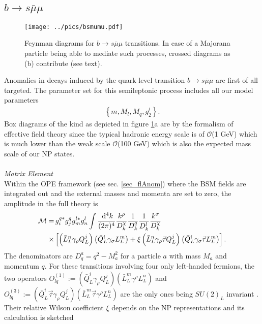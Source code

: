 \subsection{$b\rightarrow s\bar\mu\mu$}
\label{sec_bsmumu}
\begin{figure}[t]
 \texttt{[image: ../pics/bsmumu.pdf]}
 \caption{Feynman diagrams for $b\rightarrow s \bar\mu\mu$ transitions. In case of a Majorana particle being able to mediate such processes, crossed
 diagrams as (b) contribute (see text).}
 \label{pic_Bsmumu}
\end{figure}
Anomalies in decays induced by the quark level transition $b\rightarrow s\bar\mu\mu$ are first of all targeted. The parameter set for this 
semileptonic process includes all our model parameters
\begin{align}
 \left\{m, M_l, M_q, g_2^l\right\}.
\end{align}
Box diagrams of the kind as depicted in figure \ref{pic_Bsmumu}a are by the formalism of effective field theory since the typical hadronic energy 
scale is of $\mathcal{O}$(1 GeV) which is much lower than the weak scale $\mathcal{O}$(100 GeV) which is also the expected mass scale of our NP states. 
\\ \\ \noindent \textit{Matrix Element}\\
\noindent Within the OPE framework (see sec. \ref{sec_flAnom}) where the BSM fields are integrated out 
and the external masses and momenta are set to zero, the amplitude in the full theory is
\begin{align}
 \mathcal{M} =&\,g_i^{q*} g_j^{q} g_m^{l*} g_n^l\int \frac{\; \mathrm{d}^4 k}{(2\pi)^4} \frac{k^\rho}{D^\chi_k}\frac{1}{D^q_k} \frac{1}{D^l_k} \frac{k^\sigma}{D^\chi_k} \nonumber\\
 \times&\left[\left(\bar L_L^n \gamma_\rho Q_L^j\right) \left(\bar Q_L^i \gamma_\sigma L_L^m\right) + \xi\left(\bar L_L^n \gamma_\rho\vec\tau Q_L^j\right) \left(\bar Q_L^i \gamma_\sigma \vec\tau L_L^m\right)\right].
 \label{eq_matElemBSmumu}
\end{align}
The denominators are $D_q^a = q^2-M_a^2$ for a particle $a$ with mass $M_a$ and momentum $q$. For these transitions involving four only left-handed
fermions, the two operators 
$O_{lq}^{(1)}:=\left(\bar Q_L^i \gamma_\rho Q_L^j\right)\left(\bar L_L^m \gamma^\rho L_L^n\right)$ and 
$O_{lq}^{(3)}:=\left(\bar Q_L^i\vec \tau \gamma_\rho Q_L^j\right)\left(\bar L_L^m\vec \tau \gamma^\rho L_L^n\right)$ are the only ones being
$SU(2)_L$ invariant \cite{1008.4884}. Their relative Wilson coefficient $\xi$ depends on the NP representations and its calculation is sketched

